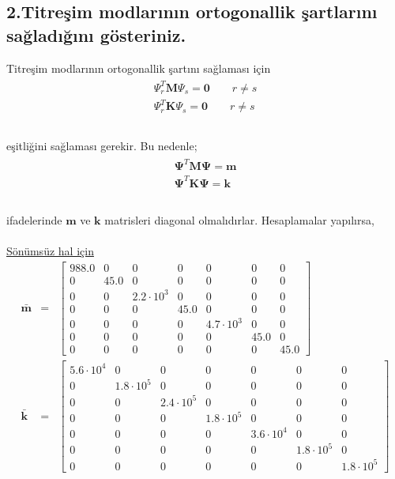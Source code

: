 \documentclass[a4paper]{report}
\begin{document}
\subsection*{2.Titreşim modlarının ortogonallik şartlarını sağladığını gösteriniz.}
Titreşim modlarının ortogonallik şartını sağlaması için
\begin{eqnarray*}
\begin{array}{c}
{\Psi}_r^T\mathbf{M}{\Psi}_s=\mathbf{0}\qquad r\neq s\\
{\Psi}_r^T\mathbf{K}{\Psi}_s=\mathbf{0}\qquad r\neq s\\
\end{array}
\end{eqnarray*}\\
eşitliğini sağlaması gerekir. Bu nedenle;
\begin{eqnarray*}
\begin{array}{c}
\mathbf{\Psi}^T\mathbf{M}{\mathbf{\Psi}}=\mathbf{m}\\
\mathbf{\Psi}^T\mathbf{K}{\mathbf{\Psi}}=\mathbf{k}\\
\end{array}
\end{eqnarray*}\\
ifadelerinde $\mathbf{m}$ ve $\mathbf{k}$ matrisleri diagonal olmalıdırlar. Hesaplamalar yapılırsa,\\
~\\
\underline{Sönümsüz hal için}
\begin{eqnarray*}
\bar{ \mathbf{m}}&=&\left[\begin{array}{ccccccc} 988.0 & 0 & 0 & 0 & 0 & 0 & 0\\ 0 & 45.0 & 0 & 0 & 0 & 0 & 0\\ 0 & 0 & 2.2\cdot 10^3 & 0 & 0 & 0 & 0\\ 0 & 0 & 0 & 45.0 & 0 & 0 & 0\\ 0 & 0 & 0 & 0 & 4.7\cdot 10^3 & 0 & 0\\ 0 & 0 & 0 & 0 & 0 & 45.0 & 0\\ 0 & 0 & 0 & 0 & 0 & 0 & 45.0 \end{array}\right]\\
\bar{ \mathbf{k}}&=&\left[\begin{array}{ccccccc} 5.6\cdot 10^4 & 0 & 0 & 0 & 0 & 0 & 0\\ 0 & 1.8\cdot 10^5 & 0 & 0 & 0 & 0 & 0\\ 0 & 0 & 2.4\cdot 10^5 & 0 & 0 & 0 & 0\\ 0 & 0 & 0 & 1.8\cdot 10^5 & 0 & 0 & 0\\ 0 & 0 & 0 & 0 & 3.6\cdot 10^4 & 0 & 0\\ 0 & 0 & 0 & 0 & 0 & 1.8\cdot 10^5 & 0\\ 0 & 0 & 0 & 0 & 0 & 0 & 1.8\cdot 10^5 \end{array}\right]
\end{eqnarray*}
\end{document}
